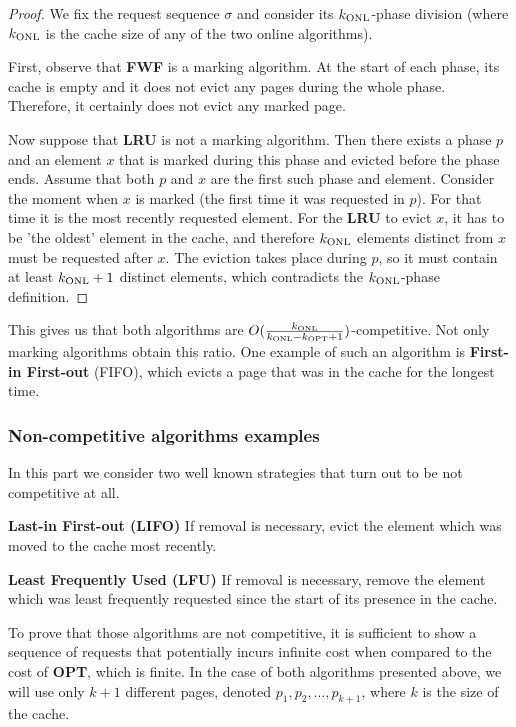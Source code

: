 \begin{proof}
 We fix the request sequence $\sigma$ and consider its $k_{\mathrm{ONL}}$-phase division 
(where $k_{\mathrm{ONL}}$ is the cache size of any of the two online algorithms).

First, observe that \textbf{FWF} is a marking algorithm. At the start of each phase, 
its cache is empty and it does not evict any pages during the whole phase. 
Therefore, it certainly does not evict any marked page.

Now suppose that \textbf{LRU} is not a marking algorithm. Then there exists a 
phase $p$ and an element $x$ that is marked during this phase and evicted before 
the phase ends. Assume that both $p$ and $x$ are the first such phase and element. 
Consider the moment when $x$ is marked (the first time it was requested in $p$). 
For that time it is the most recently requested element. For the \textbf{LRU} to 
evict $x$, it has to be 'the oldest' element in the cache, and therefore
$k_{\mathrm{ONL}}$ elements distinct from $x$ must be requested after $x$. The eviction takes place 
during $p$, so it must contain 
at least $k_{\mathrm{ONL}}+1$ distinct elements, which contradicts the $k_{\mathrm{ONL}}$-phase definition. 
\end{proof}
This gives us that both algorithms are $O(\frac{k_{\mathrm{ONL}}}{k_{\mathrm{ONL}}-k_{\mathrm{OPT}}+1})$-competitive. Not 
only marking algorithms obtain this ratio. One example of such an algorithm is 
\textbf{First-in First-out} (FIFO), which evicts a page that was in the cache for 
the longest time.

\subsubsection{Non-competitive algorithms examples}
In this part we consider two well known strategies that turn out to be not 
competitive at all.
\begin{myalgo}
 \textbf{Last-in First-out (LIFO)}
 \newline
If removal is necessary, evict the element which was moved to the cache most 
recently.
\end{myalgo}
\begin{myalgo}
 \textbf{Least Frequently Used (LFU)}
 \newline
If removal is necessary, remove the element which was least frequently requested since the start of its 
presence in the cache.
\end{myalgo}

To prove that those algorithms are not competitive, it is sufficient to show a sequence 
of requests that potentially incurs infinite cost when compared to the cost of 
\textbf{OPT}, which is finite. In the case of both algorithms presented above, we 
will use only 
$k+1$ different pages, denoted $p_1, p_2, \ldots, p_{k+1}$, where $k$ is the 
size of the cache.

